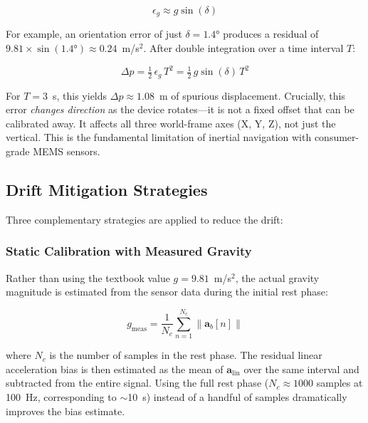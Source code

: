 \begin{equation}
  \epsilon_g \approx g \sin(\delta)
  \label{eq:gravity_leakage}
\end{equation}

\noindent For example, an orientation error of just $\delta = 1.4°$ produces
a residual of $9.81 \times \sin(1.4°) \approx 0.24$~m/s$^2$. After double
integration over a time interval $T$:

\begin{equation}
  \Delta p = \tfrac{1}{2}\,\epsilon_g\,T^2
           = \tfrac{1}{2}\,g\sin(\delta)\,T^2
  \label{eq:drift_position}
\end{equation}

\noindent For $T = 3$~s, this yields $\Delta p \approx 1.08$~m of spurious
displacement. Crucially, this error \emph{changes direction} as the device
rotates---it is not a fixed offset that can be calibrated away. It affects all
three world-frame axes (X, Y, Z), not just the vertical. This is the
fundamental limitation of inertial navigation with consumer-grade MEMS
sensors.

\subsection{Drift Mitigation Strategies}
\label{sec:proj:mitigation}

Three complementary strategies are applied to reduce the drift:

\subsubsection{Static Calibration with Measured Gravity}
\label{sec:proj:calibration}

Rather than using the textbook value $g = 9.81$~m/s$^2$, the actual gravity
magnitude is estimated from the sensor data during the initial rest phase:

\begin{equation}
  g_\text{meas} = \frac{1}{N_c} \sum_{n=1}^{N_c}
    \lVert \mathbf{a}_b[n] \rVert
  \label{eq:g_measured}
\end{equation}

\noindent where $N_c$ is the number of samples in the rest phase.
The residual linear acceleration bias is then estimated as the mean of
$\mathbf{a}_\text{lin}$ over the same interval and subtracted from the entire
signal. Using the full rest phase ($N_c \approx 1000$ samples at 100~Hz,
corresponding to $\sim$10~s) instead of a handful of samples dramatically
improves the bias estimate.

